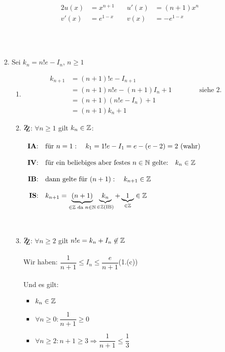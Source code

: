 \begin{Beweis}
\begin{enumerate}
\begin{minipage}{0.45\textwidth}
\begin{alignat*}{2}
u(x)&=x^{n+1}\quad& u\prime(x)&=(n+1)x^n\\
v'(x)&=e^{1-x}\quad & v(x)&=-e^{1-x}
\end{alignat*}
\end{minipage}
 \\\\
\item Sei $k_n=n!e-I_n$, $n\geq1$
\begin{enumerate}
\item
\begin{align*}
k_{n+1}&=(n+1)!e-I_{n+1}\\
&=(n+1)n!e-(n+1)I_n+1\qquad\qquad\mbox{siehe 2.}\\
&=(n+1)(n!e-I_n)+1\\
&=(n+1)k_n+1
\end{align*}
\newpage
\item $\zz$: $\forall n\geq1$ gilt $k_n\in\mathbb{Z}$:\\\\
$\begin{array}{rl}
\mbox{\textbf{IA}:} & \mbox{für }n=1:\quad k_1=1!e-I_1=e-(e-2)=2 \mbox{ (wahr)} \\\\
\mbox{\textbf{IV}:} & \mbox{für ein beliebiges aber festes }n\in\mathbb{N} \mbox{ gelte:}\quad k_n\in\mathbb{Z}\\\\
\mbox{\textbf{IB}:} & \mbox{dann gelte für }(n+1):\quad k_{n+1}\in\mathbb{Z}\\\\
\mbox{\textbf{IS}:} & k_{n+1}=\underbrace{(n+1)}_{\in\mathbb{Z}\text{ da }n\in\mathbb{N}}\underbrace{k_n}_{\in\mathbb{Z}\text{(IB)}}+\underbrace{1}_{\in\mathbb{Z}}\in\mathbb{Z}\\\\
\end{array}$
\\\\
\item $\zz$: $\forall n\geq 2$ gilt $n!e=k_n+I_n\not\in\mathbb{Z}$\\\\
Wir haben: $\dfrac{1}{n+1}\leq I_n \leq  \dfrac{e}{n+1}$\quad(1.(c))\\\\
Und es gilt: \begin{itemize}\item$k_n\in\mathbb{Z}$
				\item $\forall n\geq0:\dfrac{1}{n+1}\geq 0$
				\item $\forall n\geq2:n+1\geq3\Rightarrow \dfrac{1}{n+1}\leq \dfrac{1}{3}$\\

\end{itemize}
\end{enumerate}
\end{enumerate}
\end{Beweis}
